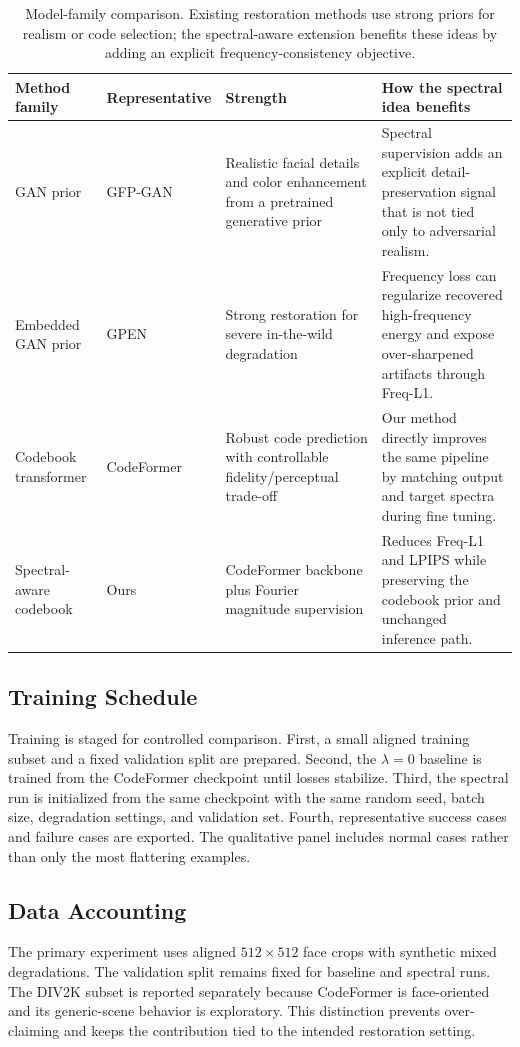 \documentclass[10pt,twocolumn,letterpaper]{article}
\begin{document}
\begin{table}[t]
\centering
\small
\begin{tabular}{p{}p{}p{}p{}}
\toprule
Method family & Representative & Strength & How the spectral idea benefits\\
\midrule
GAN prior & GFP-GAN \cite{wang2021gfpgan} & Realistic facial details and color enhancement from a pretrained generative prior & Spectral supervision adds an explicit detail-preservation signal that is not tied only to adversarial realism.\\
Embedded GAN prior & GPEN \cite{yang2021gpen} & Strong restoration for severe in-the-wild degradation & Frequency loss can regularize recovered high-frequency energy and expose over-sharpened artifacts through Freq-L1.\\
Codebook transformer & CodeFormer \cite{zhou2022codeformer} & Robust code prediction with controllable fidelity/perceptual trade-off & Our method directly improves the same pipeline by matching output and target spectra during fine tuning.\\
Spectral-aware codebook & Ours & CodeFormer backbone plus Fourier magnitude supervision & Reduces Freq-L1 and LPIPS while preserving the codebook prior and unchanged inference path.\\
\bottomrule
\end{tabular}
\caption{Model-family comparison. Existing restoration methods use strong priors for realism or code selection; the spectral-aware extension benefits these ideas by adding an explicit frequency-consistency objective.}
\label{tab:modelcompare}
\end{table}

\subsection{Training Schedule}
Training is staged for controlled comparison. First, a small aligned training subset and a fixed validation split are prepared. Second, the $\lambda=0$ baseline is trained from the CodeFormer checkpoint until losses stabilize. Third, the spectral run is initialized from the same checkpoint with the same random seed, batch size, degradation settings, and validation set. Fourth, representative success cases and failure cases are exported. The qualitative panel includes normal cases rather than only the most flattering examples.

\subsection{Data Accounting}
The primary experiment uses aligned $512\times512$ face crops with synthetic mixed degradations. The validation split remains fixed for baseline and spectral runs. The DIV2K subset is reported separately because CodeFormer is face-oriented and its generic-scene behavior is exploratory. This distinction prevents over-claiming and keeps the contribution tied to the intended restoration setting.
\end{document}
